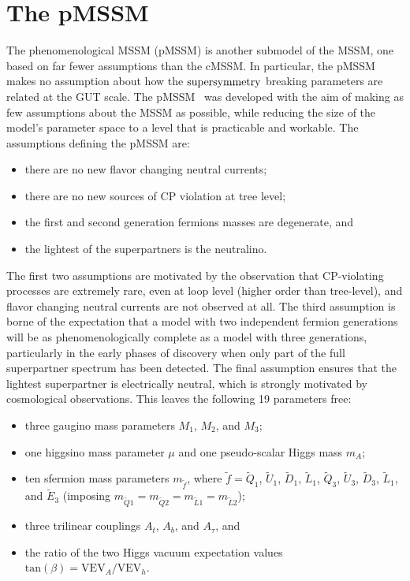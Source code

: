 \section{The pMSSM}
\label{sec:pmssm}
The phenomenological MSSM (pMSSM) is another submodel of the MSSM, one based on far fewer assumptions than the cMSSM. In particular, the pMSSM makes no assumption about how the $\text{supersymmetry}$ breaking parameters are related at the GUT scale. The pMSSM~\cite{Berger:2008cq} was developed with the aim of making as few assumptions about the MSSM as possible, while reducing the size of the model's parameter space to a level that is practicable and workable. The assumptions defining the pMSSM are:
\begin{itemize}
\item{there are no new flavor changing neutral currents;}
\item{there are no new sources of CP violation at tree level;}
\item{the first and second generation fermions masses are degenerate, and}
\item{the lightest of the superpartners is the neutralino.}
\end{itemize}
The first two assumptions are motivated by the observation that CP-violating processes are extremely rare, even at loop level (higher order than tree-level), and flavor changing neutral currents are not observed at all. The third assumption is borne of the expectation that a model with two independent fermion generations will be as phenomenologically complete as a model with three generations, particularly in the early phases of discovery when only part of the full superpartner spectrum has been detected. The final assumption ensures that the lightest superpartner is electrically neutral, which is strongly motivated by cosmological observations. This leaves the following 19 parameters free:
\begin{itemize}
\item{three gaugino mass parameters {\color{red}$M_1$}, {\color{red}$M_2$}, and {\color{red}$M_3$};}
\item{one higgsino mass parameter $\mu$ and one pseudo-scalar Higgs mass $m_A$;}
\item{ten sfermion mass parameters {\color{blue}$m_{\tilde{f}}$}, where $\tilde{f}=\tilde{Q}_1$, $\tilde{U}_1$, $\tilde{D}_1$, $\tilde{L}_1$,  $\tilde{Q}_3$, $\tilde{U}_3$, $\tilde{D}_3$, $\tilde{L}_1$, and $\tilde{E}_3$ (imposing $m_{\tilde{Q}1}=m_{\tilde{Q}2}=m_{\tilde{L}1}=m_{\tilde{L}2}$);}
\item{three trilinear couplings {\color{Green}$A_t$}, {\color{Green}$A_b$}, and {\color{Green}$A_\tau$}, and}
\item{the ratio of the two Higgs vacuum expectation values $\text{tan}(\beta)=\text{VEV}_A/\text{VEV}_h$.}
\end{itemize}

